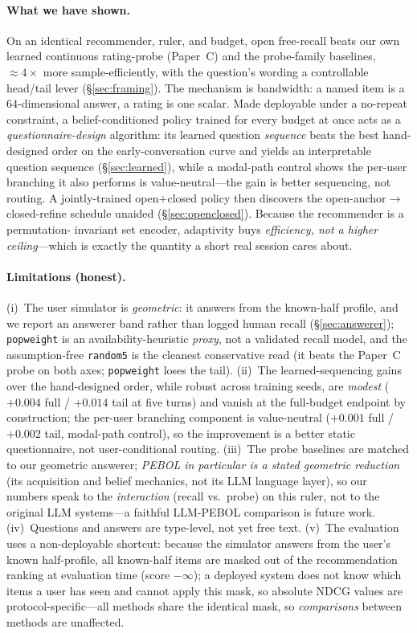 \documentclass[11pt]{article}
\begin{document}
\paragraph{What we have shown.} On an identical recommender, ruler, and budget, open free-recall beats our own learned
continuous rating-probe (Paper~C) and the probe-family baselines, $\approx 4\times$ more sample-efficiently, with the
question's wording a controllable head/tail lever (\S\ref{sec:framing}). The mechanism is bandwidth: a named item is a
$64$-dimensional answer, a rating is one scalar. Made deployable under a no-repeat constraint, a belief-conditioned
policy trained for every budget at once acts as a \emph{questionnaire-design} algorithm: its learned question
\emph{sequence} beats the best hand-designed order on the early-conversation curve and yields an interpretable question
sequence (\S\ref{sec:learned}), while a modal-path control shows the per-user branching it also performs is
value-neutral---the gain is better sequencing, not routing. A jointly-trained open$+$closed policy then discovers the
open-anchor$\to$closed-refine schedule unaided (\S\ref{sec:openclosed}). Because the recommender is a permutation-
invariant set encoder, adaptivity buys \emph{efficiency, not a higher ceiling}---which is exactly the quantity a short
real session cares about.

\paragraph{Limitations (honest).} (i)~The user simulator is \emph{geometric}: it answers from the known-half profile,
and we report an answerer band rather than logged human recall (\S\ref{sec:answerer}); \texttt{popweight} is an
availability-heuristic \emph{proxy}, not a validated recall model, and the assumption-free \texttt{random5} is the
cleanest conservative read (it beats the Paper~C probe on both axes; \texttt{popweight} loses the tail). (ii)~The learned-sequencing gains over the hand-designed order, while robust across training
seeds, are \emph{modest} ($+0.004$ full / $+0.014$ tail at five turns) and vanish at the full-budget endpoint by
construction; the per-user branching component is value-neutral ($+0.001$ full / $+0.002$ tail, modal-path control),
so the improvement is a better static questionnaire, not user-conditional routing. (iii)~The probe baselines are matched to our geometric answerer; \emph{PEBOL in particular is a stated
geometric reduction} (its acquisition and belief mechanics, not its LLM language layer), so our numbers speak to the
\emph{interaction} (recall vs.\ probe) on this ruler, not to the original LLM systems---a faithful LLM-PEBOL comparison
is future work. (iv)~Questions and answers are type-level, not yet free text. (v)~The evaluation uses a
non-deployable shortcut: because the simulator answers from the user's known half-profile, all known-half items are
masked out of the recommendation ranking at evaluation time (score $-\infty$); a deployed system does not know which
items a user has seen and cannot apply this mask, so absolute NDCG values are protocol-specific---all methods share
the identical mask, so \emph{comparisons} between methods are unaffected.
\end{document}
